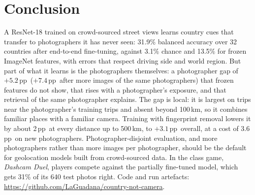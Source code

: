 \documentclass[11pt]{article}
\newcommand{\pp}{\,pp}
\begin{document}
\section{Conclusion}
A ResNet-18 trained on crowd-sourced street views learns country cues that transfer to photographers it
has never seen: 31.9\% balanced accuracy over 32 countries after end-to-end fine-tuning, against 3.1\%
chance and 13.5\% for frozen ImageNet features, with errors that respect driving side and world region.
But part of what it learns is the photographers themselves: a photographer gap of $+5.2$\pp\ ($+7.4$\pp\
after more images of the same photographers) that frozen features do not show, that rises with a
photographer's exposure, and that retrieval of the same photographer explains. The gap is local: it is
largest on trips near the photographer's training trips and absent beyond 100\,km, so it combines familiar
places with a familiar camera. Training with fingerprint removal lowers it by about 2\pp\ at every distance up to 500\,km,
to $+3.1$\pp\ overall, at a cost of 3.6\pp\ on new photographers. Photographer-disjoint evaluation, and more
photographers rather than more images per photographer, should be the default for geolocation models built
from crowd-sourced data. In the class game, \emph{Dashcam Duel}, players compete against the partially
fine-tuned model, which gets 31\% of its 640 test photos right. Code and run
artefacts: \url{https://github.com/LaGuadana/country-not-camera}.
\end{document}
